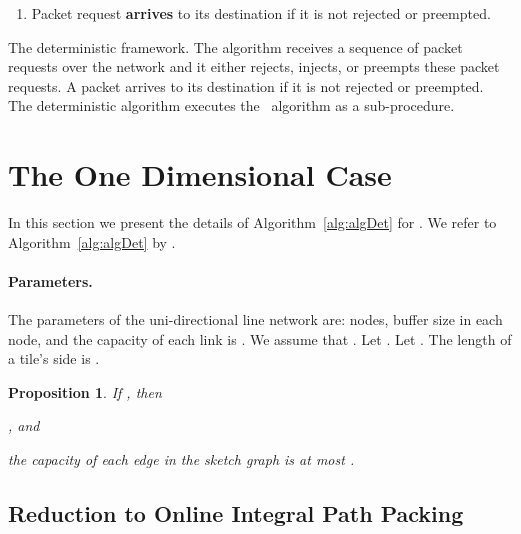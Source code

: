 \documentclass[11pt]{article}
\newtheorem{proposition}[theorem]{Proposition}
\newcommand{\route}{\text{\sc{ipp}}}
\newcommand{\IPP}{\route}
\newcommand{\alg}{\text{\sc{alg}}}
\newenvironment{proof sketch}[1]{\noindent {\emph{Proof sketch of #1:}}}{\hfill \qed}
\begin{document}
\begin{algorithm}[H]
\begin{enumerate}
\begin{comment}
                \end{enumerate}
\end{comment}
            \item Packet request  \textbf{arrives} to its destination  if it is not rejected or preempted.
        \end{enumerate}
\caption{The deterministic framework. The algorithm receives a sequence of packet requests over the network  and it either rejects, injects, or preempts these packet requests. A packet arrives to its destination if it is not rejected or preempted. The deterministic algorithm executes the \IPP\ algorithm as a sub-procedure.}\label{alg:algDet}
\end{algorithm}

\section{The One Dimensional Case}\label{sec:alg}
In this section we present the details of Algorithm~\ref{alg:algDet} for .
We refer to Algorithm~\ref{alg:algDet} by \alg.

\paragraph{Parameters.}The parameters of the uni-directional line network  are:
 nodes, buffer size  in each node, and the capacity
of each link is . We assume that .
Let .
Let . The length of a
tile's side is .

\begin{proposition}\label{prop:tiling}
If , then
\begin{inparaenum}[(i)]
\item, and
\item the capacity of each edge in the sketch graph is at most
  .
\end{inparaenum}
\end{proposition}


\subsection{Reduction to Online Integral Path Packing}\label{sec:reduce}
\begin{comment}
  The reduction to path packing has to deal with these issues:
  \begin{inparaenum}[(i)]
  \item Handling requests \emph{inside} a tile.
  \item bounding the loads on the sketch edges.
  \item Determining a specific destination node per request.
  \end{inparaenum} To deal with these issues, we augment the sketch graph as follows.
\end{comment}
\end{document}
